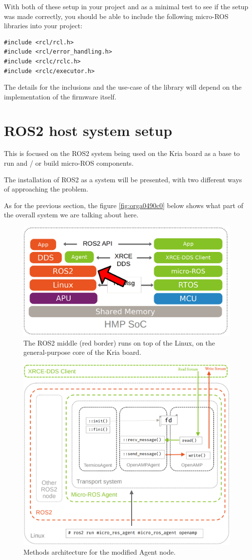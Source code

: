 \documentclass[10pt]{article}
\begin{document}
\pagebreak
With both of these setup in your project and as a minimal test to see if the setup was made correctly,
you should be able to include the following micro-ROS libraries into your project:
\begin{verbatim}
#include <rcl/rcl.h>
#include <rcl/error_handling.h>
#include <rclc/rclc.h>
#include <rclc/executor.h>
\end{verbatim}

The details for the inclusions and the use-case of the library will depend on the implementation
of the firmware itself.
\clearpage
\section{ROS2 host system setup}
\label{sec:org43ee858}
This is focused on the ROS2 system being used on the Kria board as a base to run and / or build
micro-ROS components.

The installation of ROS2 as a system will be presented, with
two different ways of approaching the problem.

As for the previous section, the figure \ref{fig:orga0490c0} below shows what part
of the overall system we are talking about here.

\begin{figure}[htbp]
\centering
\includegraphics[width=.6\textwidth]{./img/map_ros.png}
\caption{\label{fig:orge7360ec}The ROS2 middle (red border) runs on top of the Linux, on the general-purpose core of the Kria board.}
\end{figure}

\begin{figure}[htbp]
\centering
\includegraphics[width=.55\textwidth]{./img/agent_arch.png}
\caption{\label{fig:orgaca8d4a}Methods architecture for the modified Agent node.}
\end{figure}
\end{document}

